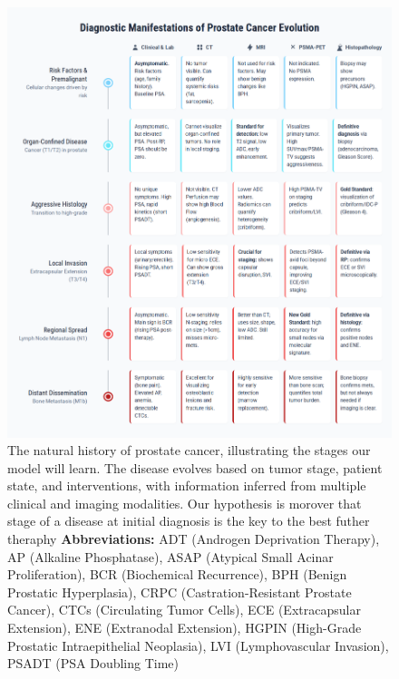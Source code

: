 \documentclass[11pt, a4paper]{article}
\begin{document}
\begin{figure}[H]
    \centering
    \includegraphics[width=\textwidth]{pe.png}
    \caption{The natural history of prostate cancer, illustrating the stages our model will learn. The disease evolves based on tumor stage, patient state, and interventions, with information inferred from multiple clinical and imaging modalities. Our hypothesis is morover that stage of a disease at initial diagnosis is the key to the best futher theraphy \textbf{Abbreviations:} ADT (Androgen Deprivation Therapy), AP (Alkaline Phosphatase), ASAP (Atypical Small Acinar Proliferation), BCR (Biochemical Recurrence), BPH (Benign Prostatic Hyperplasia), CRPC (Castration-Resistant Prostate Cancer), CTCs (Circulating Tumor Cells), ECE (Extracapsular Extension), ENE (Extranodal Extension), HGPIN (High-Grade Prostatic Intraepithelial Neoplasia), LVI (Lymphovascular Invasion), PSADT (PSA Doubling Time)}
    \label{fig:prostate_evolution}
\end{figure}
\end{document}

